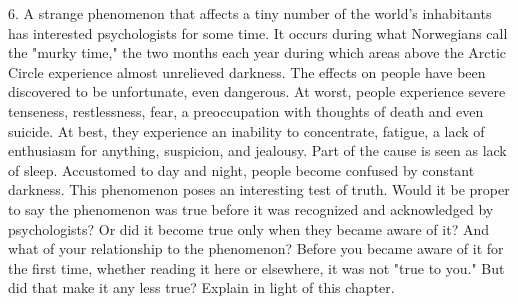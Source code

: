 \documentclass{book}
\begin{document}
6. A strange phenomenon that affects a tiny number of the world’s inhabitants has interested psychologists for some time. It occurs during what Norwegians call the "murky time," the two months each year during which areas above the Arctic Circle experience almost unrelieved darkness. The effects on people have been discovered to be unfortunate, even dangerous. At worst, people experience severe tenseness, restlessness, fear, a preoccupation with thoughts of death and even suicide. At best, they experience an inability to concentrate, fatigue, a lack of enthusiasm for anything, suspicion, and jealousy. Part of the cause is seen as lack of sleep. Accustomed to day and night, people become confused by constant darkness. This phenomenon poses an interesting test of truth. Would it be proper to say the phenomenon was true before it was recognized and acknowledged by psychologists? Or did it become true only when they became aware of it? And what of your relationship to the phenomenon? Before you became aware of it for the first time, whether reading it here or elsewhere, it was not "true to you." But did that make it any less true? Explain in light of this chapter.
\end{document}
